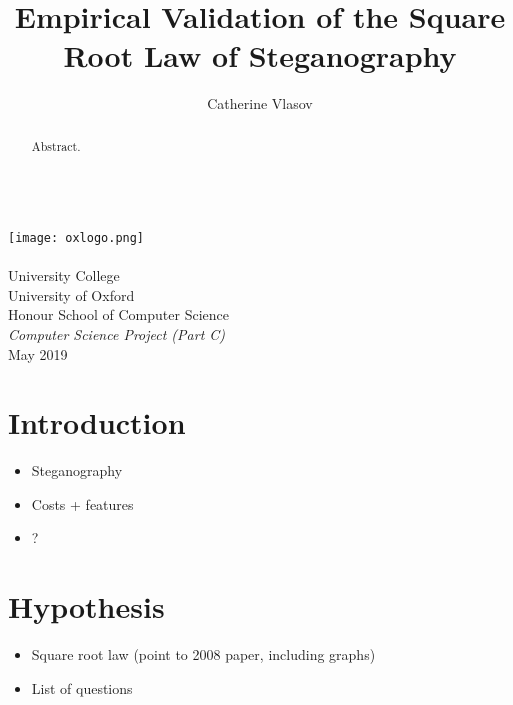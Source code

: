 \documentclass[11pt,a4paper,twoside,openright]{report}
\author{Catherine Vlasov}
\title{Empirical Validation of the Square Root Law of Steganography}
\begin{document}
\makeatletter
	\begin{titlepage}
		\vspace*{\fill}
		\begin{center}
			{\huge \bfseries \@title }
			\\[20ex]
			\texttt{[image: oxlogo.png]}
			\\[10ex]
			{\LARGE \@author}
			\\[3ex]
			{\Large University College}
			\\[1ex]
			{\Large University of Oxford}
			\\[8ex]
			{\Large Honour School of Computer Science}
			\\[1ex]
			{\Large \emph{Computer Science Project (Part C)}}
			\\[10ex]
			{\LARGE May 2019}
		\end{center}
		\vspace*{\fill}
	\end{titlepage}
\makeatother


\shipout\null


\begin{abstract}

Abstract.

\end{abstract}


\shipout\null
{}

\tableofcontents

\cleardoublepage
{}
\newpage

\chapter{Introduction}

\begin{itemize}
    \item Steganography
    \item Costs + features
    \item ?
\end{itemize}

\chapter{Hypothesis}

\begin{itemize}
    \item Square root law (point to 2008 paper, including graphs)
    \item List of questions
\end{itemize}
\end{document}
